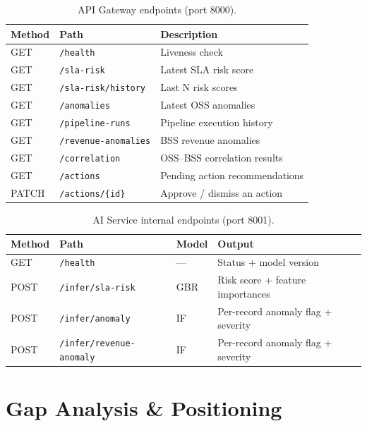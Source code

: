 \documentclass[12pt,a4paper]{report}
\begin{document}
\begin{table}[H]
\centering\small
\caption{API Gateway endpoints (port 8000).}
\begin{tabularx}{\textwidth}{@{}llX@{}}
\toprule
\textbf{Method} & \textbf{Path} & \textbf{Description} \\
\midrule
GET & \texttt{/health}            & Liveness check \\
GET & \texttt{/sla-risk}          & Latest SLA risk score \\
GET & \texttt{/sla-risk/history}  & Last N risk scores \\
GET & \texttt{/anomalies}         & Latest OSS anomalies \\
GET & \texttt{/pipeline-runs}     & Pipeline execution history \\
GET & \texttt{/revenue-anomalies} & BSS revenue anomalies \\
GET & \texttt{/correlation}       & OSS--BSS correlation results \\
GET & \texttt{/actions}           & Pending action recommendations \\
PATCH & \texttt{/actions/\{id\}}  & Approve / dismiss an action \\
\bottomrule
\end{tabularx}
\end{table}

\begin{table}[H]
\centering\small
\caption{AI Service internal endpoints (port 8001).}
\begin{tabularx}{\textwidth}{@{}lllX@{}}
\toprule
\textbf{Method} & \textbf{Path} & \textbf{Model} & \textbf{Output} \\
\midrule
GET  & \texttt{/health}                & ---  & Status + model version \\
POST & \texttt{/infer/sla-risk}        & GBR  & Risk score + feature importances \\
POST & \texttt{/infer/anomaly}         & IF   & Per-record anomaly flag + severity \\
POST & \texttt{/infer/revenue-anomaly} & IF   & Per-record anomaly flag + severity \\
\bottomrule
\end{tabularx}
\end{table}

\chapter{Gap Analysis \& Positioning}
\end{document}
